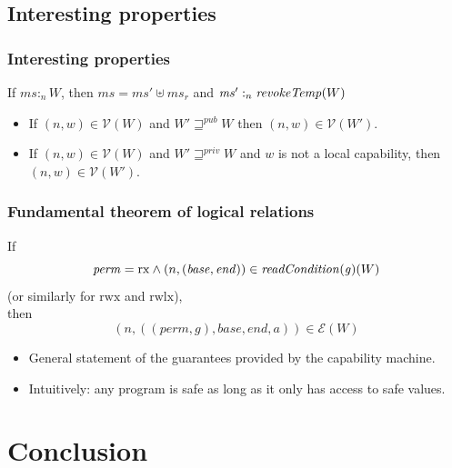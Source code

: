 \documentclass{beamer}
\newcommand{\var}[1]{\mathit{#1}}
\newcommand{\hs}{\var{ms}}
\newcommand{\gl}{\var{g}}
\newcommand{\addr}{\var{a}}
\newcommand{\start}{\var{base}}
\newcommand{\addrend}{\var{end}}
\newcommand{\heap}{\var{mem}}
\newcommand{\perm}{\var{perm}}
\newcommand{\plainfun}[2]{
  \ifthenelse{\equal{#2}{}}
  {\mathit{#1}}
  {\mathit{#1}(#2)}
}
\newcommand{\readCond}[1]{\plainfun{readCondition}{#1}}
\newcommand{\revokeTemp}[1]{\plainfun{revokeTemp}{#1}}
\newcommand{\futurewk}{\mathbin{\sqsupseteq}^{\var{pub}}}
\newcommand{\futurestr}{\mathbin{\sqsupseteq}^{\var{priv}}}
\newcommand{\heapSat}[3][\heap]{#1 :_{#2} #3}
\newcommand{\asmType}{\plaindom{AsmType}}
\newcommand{\plaindom}[1]{\mathrm{#1}}
\newcommand{\intr}[2]{\mathcal{#1}}
\newcommand{\valueintr}[1]{\intr{V}{#1}}
\newcommand{\exprintr}[1]{\intr{E}{#1}}
\newcommand{\stdvr}{\valueintr{\asmType}}
\newcommand{\stder}{\exprintr{\asmType}}
\newcommand{\npair}[2][n]{\left(#1,#2 \right)}
\newcommand{\plainperm}[1]{\mathrm{#1}}
\newcommand{\exec}{\plainperm{rx}}
\newcommand{\rwx}{\plainperm{rwx}}
\newcommand{\rwlx}{\plainperm{rwlx}}
\begin{document}
\subsection{Interesting properties}
\begin{frame}
  \frametitle{Interesting properties}
  
  \begin{lemma}
    If $\heapSat[\hs]{n}{W}$, then $\hs = \hs' \uplus \hs_r$ and
    $\heapSat[\hs']{n}{\revokeTemp{W}}$
  \end{lemma}
  \pause
  \begin{lemma}
    \begin{itemize}
    \item If $\npair{w} \in \stdvr(W)$ and $W' \futurewk W$ then $\npair{w} \in
      \stdvr(W')$.
    \item If $\npair{w} \in \stdvr(W)$ and $W' \futurestr W$ and $w$ is
      not a local capability, then $\npair{w} \in \stdvr(W')$.
    \end{itemize}
  \end{lemma}
\end{frame}

\begin{frame}
  \frametitle{Fundamental theorem of logical relations}
  \begin{theorem}[FTLR]
    If \[
      \perm = \exec \land \npair{(\start,\addrend)} \in \readCond{}(\gl)(W)
    \]
    (or similarly for $\rwx$ and $\rwlx$),\\
    then
    \[
      \npair{((\perm,\gl),\start,\addrend,\addr)} \in \stder(W)
    \]
  \end{theorem}
  \begin{itemize}
  \item General statement of the guarantees provided by the capability machine.
  \item Intuitively: any program is safe as long as it only has access to safe values.
  \end{itemize}
\end{frame}

\section{Conclusion}
\end{document}
